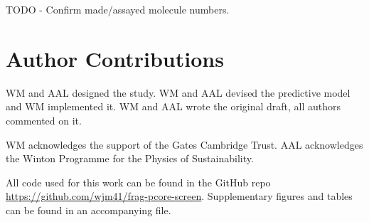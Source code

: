 TODO - Confirm made/assayed molecule numbers.

\section{Author Contributions}
WM and AAL designed the study. WM and AAL devised the predictive model and WM implemented it. WM and AAL wrote the original draft, all authors commented on it.

\begin{acknowledgement}

WM acknowledges the support of the Gates Cambridge Trust. AAL acknowledges the Winton Programme for the Physics of Sustainability.

\end{acknowledgement}

\begin{suppinfo}

All code used for this work can be found in the GitHub repo \url{https://github.com/wjm41/frag-pcore-screen}. Supplementary figures and tables can be found in an accompanying file.

\end{suppinfo}

